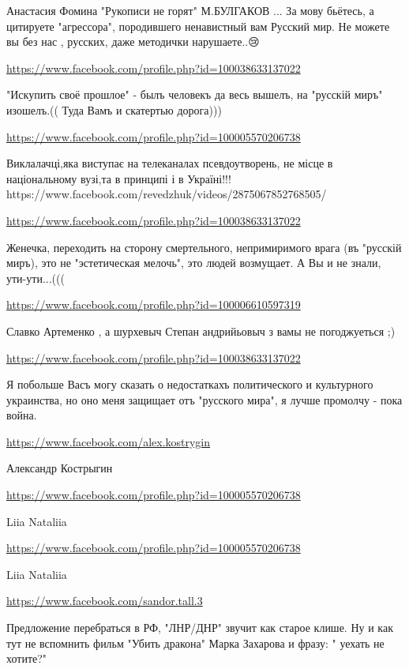 \documentclass[a4paper,11pt]{extreport}
\begin{document}
\begin{itemize}
\begin{itemize}
Анастасия Фомина
"Рукописи не горят"
М.БУЛГАКОВ
...
За мову бьётесь, а цитируете "агрессора", породившего ненавистный вам Русский мир.
Не можете вы без нас , русских,
даже методички нарушаете..😢🥳

\end{itemize}
\url{https://www.facebook.com/profile.php?id=100038633137022}

"Искупить своё прошлое" - былъ человекъ да весь вышелъ, на "русскій миръ" изошелъ.(( Туда Вамъ и скатертью дорога)))

\url{https://www.facebook.com/profile.php?id=100005570206738}

Виклалачці,яка виступає на телеканалах псевдоутворень, не місце в національному вузі,та в принципі і в Україні!!! https://www.facebook.com/revedzhuk/videos/2875067852768505/

\url{https://www.facebook.com/profile.php?id=100038633137022}

Женечка, переходить на сторону смертельного, непримиримого врага (въ "русскій миръ), это не "эстетическая мелочь", это людей возмущает. А Вы и не знали, ути-ути...(((

\begin{itemize}
\url{https://www.facebook.com/profile.php?id=100006610597319}

Славко Артеменко , а шурхевыч Степан андрийьовыч з вамы не погоджуеться ;)

\end{itemize}
\url{https://www.facebook.com/profile.php?id=100038633137022}

Я побольше Васъ могу сказать о недостаткахъ политического и культурного украинства, но оно меня защищает отъ "русского мира", я лучше промолчу - пока война.

\url{https://www.facebook.com/alex.kostrygin}

Александр Кострыгин

\url{https://www.facebook.com/profile.php?id=100005570206738}

Liia Nataliia

\url{https://www.facebook.com/profile.php?id=100005570206738}

Liia Nataliia

\url{https://www.facebook.com/sandor.tall.3}

Предложение перебраться в РФ, "ЛНР/ДНР" звучит как старое клише. Ну и как тут не вспомнить фильм "Убить дракона" Марка Захарова и фразу: " уехать не хотите?"


\end{itemize}
\end{document}
